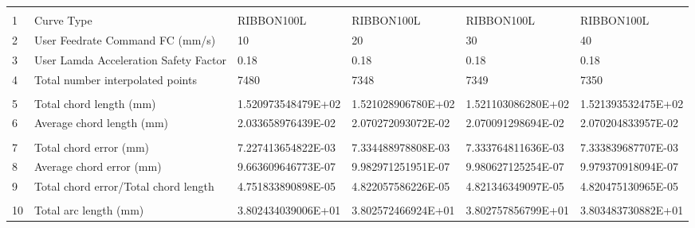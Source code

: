 

\begin{tabular}{ p{0.5cm} p{8.0cm} p{4.00cm} p{4.0cm} p{4.00cm} p{4.0cm}}
\hline
	&                                                      &                    &                      &                    & \\
1	& Curve Type	                                       & RIBBON100L	        & RIBBON100L	       & RIBBON100L	        & RIBBON100L \\
2	& User Feedrate Command FC (mm/s)                      &	10	            &    20                &	30	            &    40 \\
3	& User Lamda Acceleration Safety Factor	               &   0.18             &	0.18               &   0.18             &   0.18 \\
4	& Total number interpolated points	                   &  7480	            & 7348	               & 7349	            & 7350\\
	&                                                      &                    &                      &                    & \\
5	& Total chord length (mm)	                           & 1.520973548479E+02	& 1.521028906780E+02   & 1.521103086280E+02	& 1.521393532475E+02 \\
6	& Average chord length (mm)	                           & 2.033658976439E-02	& 2.070272093072E-02   & 2.070091298694E-02	& 2.070204833957E-02 \\
	&                                                      &                    &                      &                    & \\
7	& Total chord error (mm)	                           & 7.227413654822E-03	& 7.334488978808E-03   & 7.333764811636E-03	& 7.333839687707E-03 \\
8	& Average chord error (mm)	                           & 9.663609646773E-07	& 9.982971251951E-07   & 9.980627125254E-07	& 9.979370918094E-07 \\
9	& Total chord error/Total chord length                 & 4.751833890898E-05	& 4.822057586226E-05   & 4.821346349097E-05	& 4.820475130965E-05 \\
	&                                                      &                    &                      &                    & \\
10	& Total arc length (mm)	                               & 3.802434039006E+01	& 3.802572466924E+01   & 3.802757856799E+01	& 3.803483730882E+01 \\

\end{tabular}
